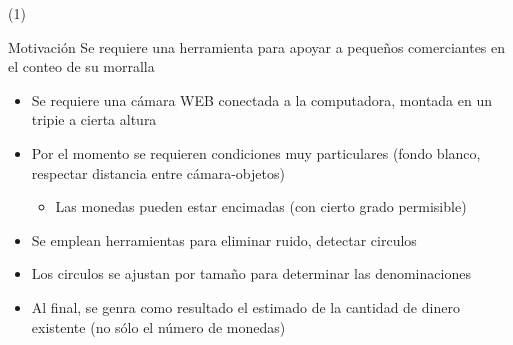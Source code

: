 \begin{frame}{\citetitle{\EntradaBibtex} \footnotemark[1] (1)}
\begin{block}{Motivación} 
Se requiere una herramienta para apoyar a pequeños comerciantes en el conteo de su morralla
\begin{itemize}
\item Se requiere una cámara WEB conectada a la computadora, montada en un tripie a cierta altura	
\item Por el momento se requieren condiciones muy particulares (fondo blanco, respectar distancia entre cámara-objetos)
\begin{itemize}
\item Las monedas pueden estar encimadas (con cierto grado permisible)
\end{itemize}
\item Se emplean herramientas para eliminar ruido, detectar circulos
\item Los circulos se ajustan por tamaño para determinar las denominaciones
\item Al final, se genra como resultado el estimado de la cantidad de dinero existente (no sólo el número de monedas)
\end{itemize}
\end{block} 
\footnotetext[1]{\fullcite{\EntradaBibtex}}
\end{frame}


